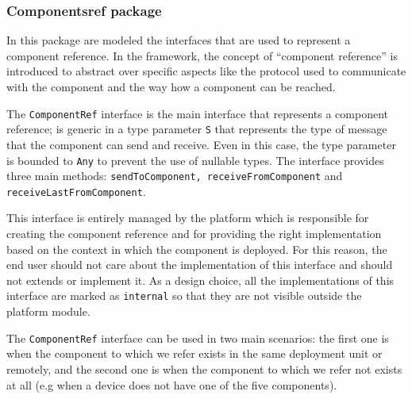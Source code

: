 \subsubsection{Componentsref package}

In this package are modeled the interfaces that are used to represent a component reference.
In the framework, the concept of ``component reference'' is introduced to abstract over specific aspects like the protocol used to communicate with
the component and the way how a component can be reached.

The \texttt{ComponentRef} interface is the main interface that represents a component reference; is generic in a type parameter \texttt{S} that
represents the type of message that the component can send and receive. Even in this case, the type parameter is bounded to \texttt{Any} to prevent
the use of nullable types. The interface provides three main methods: \texttt{sendToComponent, receiveFromComponent} and
\texttt{receiveLastFromComponent}.

This interface is entirely managed by the platform which is responsible for creating the component reference and for providing the right
implementation based on the context in which the component is deployed. For this reason, the end user should not care about the implementation
of this interface and should not extends or implement it. As a design choice, all the implementations of this interface are marked as
\texttt{internal} so that they are not visible outside the platform module.

The \texttt{ComponentRef} interface can be used in two main scenarios: the first one is when the component to which we refer exists in the same
deployment unit or remotely, and the second one is when the component to which we refer not exists at all (e.g when a device does not have one of the
five components).



